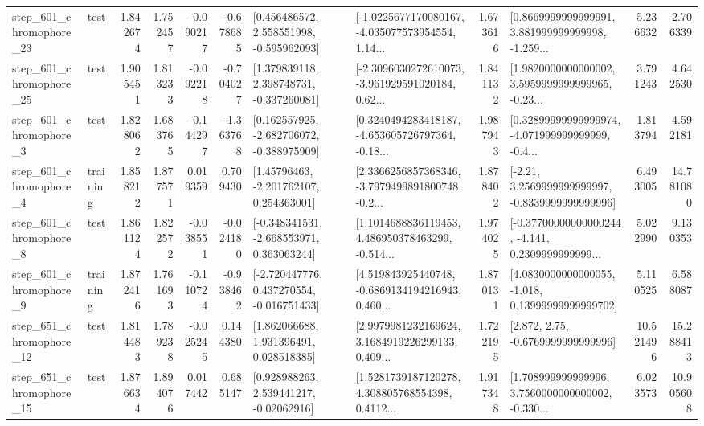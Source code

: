 \begin{tabular}{llrrrrllrlrr}
  step\_601\_chromophore\_23 &      test &      1.842674 &    1.752457 &     -0.090217 & -0.678685 &    [0.456486572, 2.558551998, -0.595962093] &  [-1.0225677170080167, -4.035077573954554, 1.14... &       1.673616 &  [0.8669999999999991, 3.881999999999998, -1.259... &            5.236632 &          2.706339 \\
  step\_601\_chromophore\_25 &      test &      1.905451 &    1.813233 &     -0.092218 & -0.704027 &    [1.379839118, 2.398748731, -0.337260081] &  [-2.3096030272610073, -3.961929591020184, 0.62... &       1.841132 &  [1.9820000000000002, 3.5959999999999965, -0.23... &            3.791243 &          4.642530 \\
   step\_601\_chromophore\_3 &      test &      1.828062 &    1.683765 &     -0.144297 & -1.363768 &   [0.162557925, -2.682706072, -0.388975909] &  [0.3240494283418187, -4.653605726797364, -0.18... &       1.987943 &  [0.32899999999999974, -4.071999999999999, -0.4... &            1.813794 &          4.592181 \\
   step\_601\_chromophore\_4 &  training &      1.858212 &    1.877571 &      0.019359 &  0.709430 &     [1.45796463, -2.201762107, 0.254363001] &  [2.3366256857368346, -3.7979499891800748, -0.2... &       1.878402 &   [-2.21, 3.2569999999999997, -0.8339999999999996] &            6.493005 &         14.781080 \\
   step\_601\_chromophore\_8 &      test &      1.861124 &    1.822572 &     -0.038551 & -0.024180 &   [-0.348341531, -2.668553971, 0.363063244] &  [1.1014688836119453, 4.486950378463299, -0.514... &       1.974025 &  [-0.37700000000000244, -4.141, 0.2309999999999... &            5.022990 &          9.130353 \\
   step\_601\_chromophore\_9 &  training &      1.872416 &    1.761693 &     -0.110724 & -0.938462 &   [-2.720447776, 0.437270554, -0.016751433] &  [4.519843925440748, -0.6869134194216943, 0.460... &       1.870131 &  [4.0830000000000055, -1.018, 0.13999999999999702] &            5.110525 &          6.588087 \\
  step\_651\_chromophore\_12 &      test &      1.814483 &    1.789238 &     -0.025245 &  0.144380 &     [1.862066688, 1.931396491, 0.028518385] &  [2.9979981232169624, 3.1684919226299133, 0.409... &       1.722195 &                 [2.872, 2.75, -0.6769999999999996] &           10.521496 &         15.288413 \\
  step\_651\_chromophore\_15 &      test &      1.876634 &    1.894076 &      0.017442 &  0.685147 &     [0.928988263, 2.539441217, -0.02062916] &  [1.5281739187120278, 4.308805768554398, 0.4112... &       1.917348 &  [1.708999999999996, 3.7560000000000002, -0.330... &            6.023573 &         10.905608 \\

\end{tabular}
